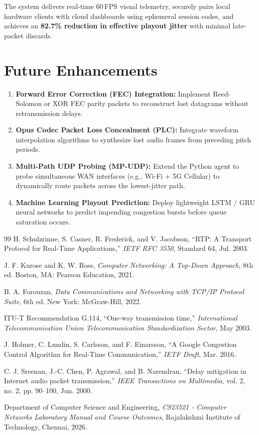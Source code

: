 \documentclass[12pt, a4paper]{report}
\begin{document}
The system delivers real-time 60\,FPS visual telemetry, securely pairs local hardware clients with cloud dashboards using ephemeral session codes, and achieves an \textbf{82.7\% reduction in effective playout jitter} with minimal late-packet discards.

\section{Future Enhancements}
\begin{enumerate}
    \item \textbf{Forward Error Correction (FEC) Integration:} Implement Reed-Solomon or XOR FEC parity packets to reconstruct lost datagrams without retransmission delays.
    \item \textbf{Opus Codec Packet Loss Concealment (PLC):} Integrate waveform interpolation algorithms to synthesize lost audio frames from preceding pitch periods.
    \item \textbf{Multi-Path UDP Probing (MP-UDP):} Extend the Python agent to probe simultaneous WAN interfaces (e.g., Wi-Fi + 5G Cellular) to dynamically route packets across the lowest-jitter path.
    \item \textbf{Machine Learning Playout Prediction:} Deploy lightweight LSTM / GRU neural networks to predict impending congestion bursts before queue saturation occurs.
\end{enumerate}

\newpage
\begin{thebibliography}{99}
H. Schulzrinne, S. Casner, R. Frederick, and V. Jacobson, ``RTP: A Transport Protocol for Real-Time Applications,'' \emph{IETF RFC 3550}, Standard 64, Jul. 2003.

J. F. Kurose and K. W. Ross, \emph{Computer Networking: A Top-Down Approach}, 8th ed. Boston, MA: Pearson Education, 2021.

B. A. Forouzan, \emph{Data Communications and Networking with TCP/IP Protocol Suite}, 6th ed. New York: McGraw-Hill, 2022.

ITU-T Recommendation G.114, ``One-way transmission time,'' \emph{International Telecommunication Union Telecommunication Standardization Sector}, May 2003.

J. Holmer, C. Lundin, S. Carlsson, and F. Einarsson, ``A Google Congestion Control Algorithm for Real-Time Communication,'' \emph{IETF Draft}, Mar. 2016.

C. J. Sreenan, J.-C. Chen, P. Agrawal, and B. Narendran, ``Delay mitigation in Internet audio packet transmission,'' \emph{IEEE Transactions on Multimedia}, vol. 2, no. 2, pp. 90--100, Jun. 2000.

Department of Computer Science and Engineering, \emph{CS23521 - Computer Networks Laboratory Manual and Course Outcomes}, Rajalakshmi Institute of Technology, Chennai, 2026.
\end{thebibliography}
\end{document}

